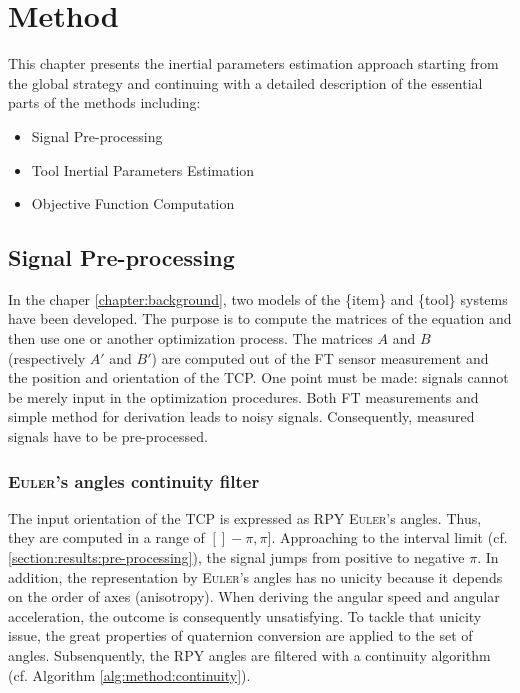 \documentclass[/home/francois/latex/report/main.tex]{subfiles}
\begin{document}
\chapter{Method}
\label{chapter:method}

This chapter presents the inertial parameters estimation approach starting from the global strategy and continuing with a detailed description of the essential parts of the methods including:

\begin{itemize}
  \item Signal Pre-processing
  \item Tool Inertial Parameters Estimation
  \item Objective Function Computation
\end{itemize}

\section{Signal Pre-processing}

In the chaper \ref{chapter:background}, two models of the \{item\} and \{tool\} systems have been developed. The purpose is to compute the matrices of the equation and then use one or another optimization process. The matrices $A$ and $B$ (respectively $A'$ and $B'$) are computed out of the \ac{FT} sensor measurement and the position and orientation of the \ac{TCP}. One point must be made: signals cannot be merely input in the optimization procedures. Both \ac{FT} measurements and simple method for derivation leads to noisy signals. Consequently, measured signals have to be pre-processed.

\subsection{\textsc{Euler}'s angles continuity filter}

The input orientation of the \ac{TCP} is expressed as \ac{RPY} \textsc{Euler}'s angles. Thus, they are computed in a range of $[]-\pi, \pi]$. Approaching to the interval limit (cf. \ref{section:results:pre-processing}), the signal jumps from positive to negative $\pi$. In addition, the representation by \textsc{Euler}'s angles has no unicity because it depends on the order of axes (anisotropy). When deriving the angular speed and angular acceleration, the outcome is consequently unsatisfying. To tackle that unicity issue, the great properties of quaternion conversion are applied to the set of angles. Subsenquently, the \ac{RPY} angles are filtered with a continuity algorithm (cf. Algorithm \ref{alg:method:continuity}).
\end{document}
